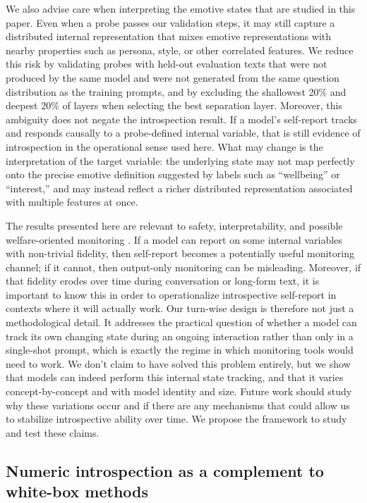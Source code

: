 \documentclass[10pt]{article}
\begin{document}
We also advise care when interpreting the emotive states that are studied in this paper. Even when a probe passes our validation steps, it may still capture a distributed internal representation that mixes emotive representations with nearby properties such as persona, style, or other correlated features. We reduce this risk by validating probes with held-out evaluation texts that were not produced by the same model and were not generated from the same question distribution as the training prompts, and by excluding the shallowest 20\% and deepest 20\% of layers when selecting the best separation layer. Moreover, this ambiguity does not negate the introspection result. If a model's self-report tracks and responds causally to a probe-defined internal variable, that is still evidence of introspection in the operational sense used here. What may change is the interpretation of the target variable: the underlying state may not map perfectly onto the precise emotive definition suggested by labels such as ``wellbeing'' or ``interest,'' and may instead reflect a richer distributed representation associated with multiple features at once.

The results presented here are relevant to safety, interpretability, and possible welfare-oriented monitoring \citep{Rahwan2019, Hagendorff2023, PerezLong2023, Long2024, DungTagliabue2025, Lu2026, Das2026}.
If a model can report on some internal variables with non-trivial fidelity, then self-report becomes a potentially useful monitoring channel; if it cannot, then output-only monitoring can be misleading. Moreover, if that fidelity erodes over time during conversation or long-form text, it is important to know this in order to operationalize introspective self-report in contexts where it will actually work.
Our turn-wise design is therefore not just a methodological detail.
It addresses the practical question of whether a model can track its own changing state during an ongoing interaction rather than only in a single-shot prompt, which is exactly the regime in which monitoring tools would need to work. We don't claim to have solved this problem entirely, but we show that models can indeed perform this internal state tracking, and that it varies concept-by-concept and with model identity and size. Future work should study why these variations occur and if there are any mechanisms that could allow us to stabilize introspective ability over time. We propose the framework to study and test these claims.

\subsection{Numeric introspection as a complement to white-box methods}
\end{document}

